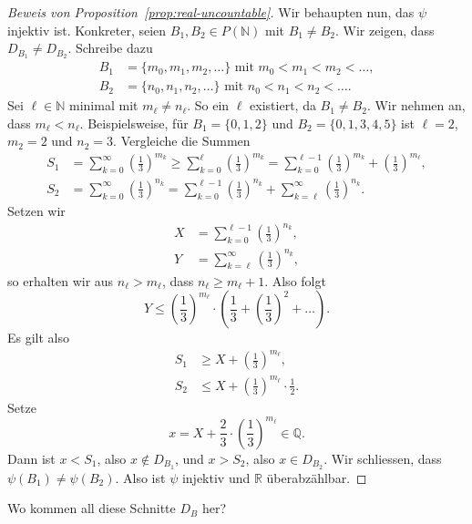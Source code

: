 \documentclass[../main.tex]{subfiles}
\begin{document}
\begin{proof}[Beweis von Proposition~\ref{prop:real-uncountable}]
Wir behaupten nun, das $\psi$ injektiv ist. Konkreter, seien
$B_{1}, B_{2} \in P(\mathbb N)$ mit $B_{1} \neq B_{2}$.
Wir zeigen, dass $D_{B_{1}} \neq D_{B_{2}}$.
Schreibe dazu
\begin{align*}
  B_{1} &= \{m_{0}, m_{1}, m_{2}, \dots\} \text{ mit } m_{0} < m_{1} < m_{2} < \dots, \\
  B_{2} &= \{n_{0}, n_{1}, n_{2}, \dots\} \text{ mit } n_{0} < n_{1} < n_{2} < \dots.
\end{align*}
Sei $\ell \in \mathbb N$ minimal mit $m_{\ell} \neq n_{\ell}$. So ein $\ell$
existiert, da $B_{1} \neq B_{2}$. Wir nehmen an, dass $m_{\ell} < n_{\ell}$.
Beispielsweise, für $B_{1} = \{0, 1, 2\}$ und $B_{2} = \{0, 1, 3, 4, 5\}$ ist
$\ell = 2$, $m_{2} = 2$ und $n_{2} = 3$.
Vergleiche die Summen
\begin{align*}
  S_{1} &= \sum_{k=0}^{\infty} {\left(\frac{1}{3}\right)}^{m_{k}}
          \geq \sum_{k=0}^{\ell} {\left(\frac{1}{3}\right)}^{m_{k}}
          = \sum_{k=0}^{\ell-1} {\left(\frac{1}{3}\right)}^{m_{k}} + {\left(\frac{1}{3}\right)}^{m_{\ell}}, \\
  S_{2} &= \sum_{k=0}^{\infty}{\left(\frac{1}{3}\right)}^{n_{k}}
          = \sum_{k=0}^{\ell - 1} {\left(\frac{1}{3}\right)}^{n_{k}}
          + \sum_{k= \ell}^{\infty} {\left(\frac{1}{3}\right)}^{n_{k}}.
\end{align*}
Setzen wir
\begin{align*}
  X &= \sum_{k=0}^{\ell - 1}{\left(\frac{1}{3}\right)}^{n_{k}}, \\
  Y &= \sum_{k= \ell}^{\infty} {\left(\frac{1}{3}\right)}^{n_{k}},
\end{align*}
so erhalten wir aus $n_{\ell} > m_{\ell}$, dass $n_{\ell} \geq m_{\ell} + 1$.
Also folgt
\[Y \leq {\left(\frac{1}{3}\right)}^{m_{\ell}} \cdot \left(
    \frac{1}{3} + {\left( \frac{1}{3}\right)}^{2} + \dots
    \right).\]
Es gilt also
\begin{align*}
  S_{1} & \geq X + {\left(\frac{1}{3}\right)}^{m_{\ell}}, \\
  S_{2} & \leq X + {\left(\frac{1}{3}\right)}^{m_{\ell}}\cdot \frac{1}{2}.
\end{align*}
Setze
\[x = X + \frac{2}{3}\cdot {\left(\frac{1}{3}\right)}^{m_{\ell}} \in \mathbb Q.\]
Dann ist $x < S_{1}$, also $x \notin D_{B_{1}}$, und $x > S_{2}$, also
$x \in D_{B_{2}}$. Wir schliessen, dass $\psi(B_{1}) \neq \psi(B_{2})$.
Also ist $\psi$ injektiv und $\mathbb R$ überabzählbar.
\end{proof}

\begin{question}
  Wo kommen all diese Schnitte $D_{B}$ her?
\end{question}
\end{document}
